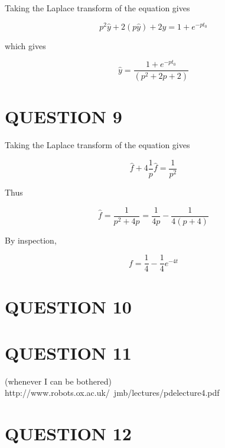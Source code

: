 \documentclass[a4paper]{article}
\begin{document}
Taking the Laplace transform of the equation gives

\[ p^{2} \hat{y} + 2 (p \hat{y}) + 2 \hat{y} = 1 + e^{-pt_{0}} \]

which gives

\[ \hat{y} = \frac{1 + e^{-pt_{0}}}{(p^{2} + 2p + 2)} \]





\section{QUESTION 9}

Taking the Laplace transform of the equation gives

\[ \hat{f} + 4 \frac{1}{p} \hat{f} = \frac{1}{p^{2}} \]

Thus

\[ \hat{f} = \frac{1}{p^{2} + 4p} = \frac{1}{4p}  - \frac{1}{4(p+4)} \]

By inspection, 

\[ f = \frac{1}{4} - \frac{1}{4} e^{-4t} \]


\section{QUESTION 10}
\section{QUESTION 11}

(whenever I can be bothered) http://www.robots.ox.ac.uk/~jmb/lectures/pdelecture4.pdf


\section{QUESTION 12}
\end{document}
